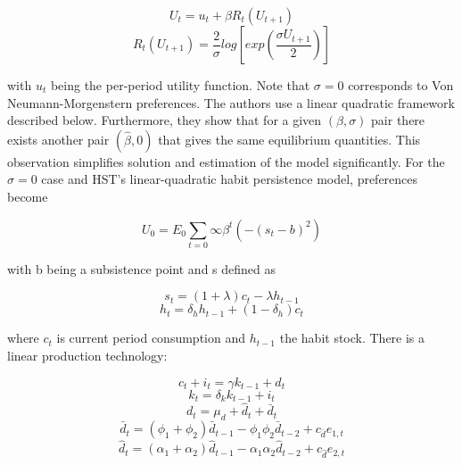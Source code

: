 \documentclass[a4paper,12pt]{scrartcl} %
\begin{document}
\begin{equation}\label{33}
U_t=u_t+\beta R_t(U_{t+1})
\end{equation}
\begin{equation}\label{34}
R_t(U_{t+1})=\frac{2}{\sigma}log[exp(\frac{\sigma U_{t+1}}{2})]
\end{equation}

with $u_t$ being the per-period utility function. Note that $\sigma=0$ corresponds to Von Neumann-Morgenstern preferences. The authors use a linear quadratic framework described below. Furthermore, they show that for a given $(\beta,\sigma)$ pair there exists another pair $(\hat{\beta},0)$ that gives the same equilibrium quantities. This observation simplifies solution and estimation of the model significantly. For the $\sigma=0$ case and HST’s linear-quadratic habit persistence model, preferences become

\begin{equation}\label{35}
U_0=E_0\sum_{t=0}{\infty}\beta^t(-(s_t-b)^2)
\end{equation}

with b being a subsistence point and s defined as

\begin{equation}\label{36}
s_t=(1+\lambda)c_t-\lambda h_{t-1}
\end{equation}
\begin{equation}\label{37}
h_t=\delta_hh_{t-1}+(1-\delta_h)c_t
\end{equation}

where $c_t$ is current period consumption and $h_{t-1}$ the habit stock. There is a linear production technology:

\begin{equation}\label{38}
c_t+i_t=\gamma k_{t-1}+d_t
\end{equation}
\begin{equation}\label{39}
k_t=\delta_k k_{t-1}+i_t
\end{equation}
\begin{equation}\label{40}
d_t=\mu_d+\hat{d}_t+\bar{d}_t
\end{equation}
\begin{equation}\label{41}
\bar{d}_t=(\phi_1+\phi_2)\bar{d}_{t-1}-\phi_1\phi_2\bar{d}_{t-2}+c_{\bar{d}}e_{1,t}
\end{equation}
\begin{equation}\label{42}
\hat{d}_t=(\alpha_1+\alpha_2)\hat{d}_{t-1}-\alpha_1\alpha_2\hat{d}_{t-2}+c_{\hat{d}}e_{2,t}
\end{equation}
\end{document}
